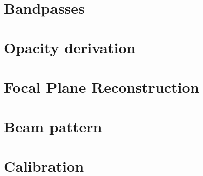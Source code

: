 \documentclass[a4paper, 11pt]{article} %
\begin{document}
\section{Bandpasses}
\label{se:bandpasses}



\section{Opacity derivation}
\label{se:opacities}





\section{Focal Plane Reconstruction}
\label{se:fp_reconstruction}






\section{Beam pattern}
\label{se:beams}



\section{Calibration}
\label{se:calibration}




\end{document}
